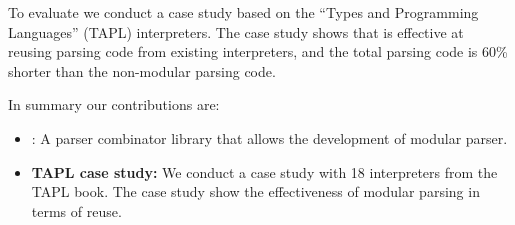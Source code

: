   To evaluate \name we conduct a case study based on the ``Types and
  Programming Languages'' (TAPL) interpreters.  The case study shows
  that \name is effective at reusing parsing code from existing
  interpreters, and the total parsing code is 60\% shorter than the
  non-modular parsing code.

In summary our contributions are:

\begin{itemize}

\item {\name:} A parser combinator library that allows the development 
of modular parser.

\item {{\bf TAPL case study:}} We conduct a case study with 18 interpreters
  from the TAPL book. The case study show the effectiveness of modular 
  parsing in terms of reuse.

\end{itemize}